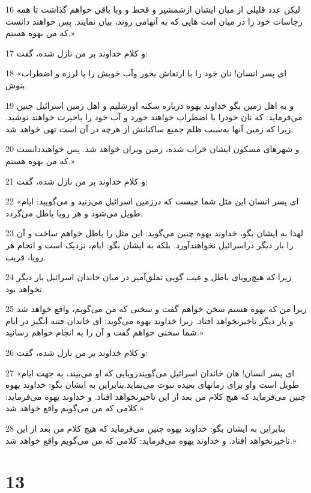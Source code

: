 \par 16 لیکن عدد قلیلی از میان ایشان ازشمشیر و قحط و وبا باقی خواهم گذاشت تا همه رجاسات خود را در میان امت هایی که به آنهامی روند، بیان نمایند. پس خواهند دانست که من یهوه هستم.»
\par 17 و کلام خداوند بر من نازل شده، گفت:
\par 18 «ای پسر انسان! نان خود را با ارتعاش بخور وآب خویش را با لرزه و اضطراب بنوش.
\par 19 و به اهل زمین بگو خداوند یهوه درباره سکنه اورشلیم و اهل زمین اسرائیل چنین می‌فرماید: که نان خودرا با اضطراب خواهند خورد و آب خود را باحیرت خواهند نوشید. زیرا که زمین آنها به‌سبب ظلم جمیع ساکنانش از هر‌چه در آن است تهی خواهد شد.
\par 20 و شهرهای مسکون ایشان خراب شده، زمین ویران خواهد شد. پس خواهیددانست که من یهوه هستم.»
\par 21 و کلام خداوند بر من نازل شده، گفت:
\par 22 «ای پسر انسان این مثل شما چیست که درزمین اسرائیل می‌زنید و می‌گویید: ایام طویل می‌شود و هر رویا باطل می‌گردد.
\par 23 لهذا به ایشان بگو، خداوند یهوه چنین می‌گوید: این مثل را باطل خواهم ساخت و آن را بار دیگر دراسرائیل نخواهند‌آورد. بلکه به ایشان بگو: ایام، نزدیک است و انجام هر رویا، قریب.
\par 24 زیرا که هیچ‌رویای باطل و غیب گویی تملق‌آمیز در میان خاندان اسرائیل بار دیگر نخواهد بود.
\par 25 زیرا من که یهوه هستم سخن خواهم گفت و سخنی که من می‌گویم، واقع خواهد شد و بار دیگر تاخیرنخواهد افتاد. زیرا خداوند یهوه می‌گوید: ای خاندان فتنه انگیز در ایام شما سخنی خواهم گفت و آن را به انجام خواهم رسانید.»
\par 26 و کلام خداوند بر من نازل شده، گفت:
\par 27 «ای پسر انسان! هان خاندان اسرائیل می‌گویندرویایی که او می‌بیند، به جهت ایام طویل است واو برای زمانهای بعیده نبوت می‌نماید.بنابراین به ایشان بگو: خداوند یهوه چنین می‌فرماید که هیچ کلام من بعد از این تاخیرنخواهد افتاد. و خداوند یهوه می‌فرماید: کلامی که من می‌گویم واقع خواهد شد.»
\par 28 بنابراین به ایشان بگو: خداوند یهوه چنین می‌فرماید که هیچ کلام من بعد از این تاخیرنخواهد افتاد. و خداوند یهوه می‌فرماید: کلامی که من می‌گویم واقع خواهد شد.»

\chapter{13}

